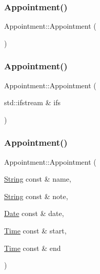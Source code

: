 \subsubsection{\texorpdfstring{Appointment()}{Appointment()}\hspace{0.1cm}{\footnotesize\ttfamily [1/3]}}
{\footnotesize\ttfamily Appointment\+::\+Appointment (\begin{DoxyParamCaption}{ }\end{DoxyParamCaption})\hspace{0.3cm}{\ttfamily [inline]}}

\mbox{\label{classAppointment_a3b5b82331c630dcce3b1e724d0e6c48e}} 
\subsubsection{\texorpdfstring{Appointment()}{Appointment()}\hspace{0.1cm}{\footnotesize\ttfamily [2/3]}}
{\footnotesize\ttfamily Appointment\+::\+Appointment (\begin{DoxyParamCaption}\item[{std\+::ifstream \&}]{ifs }\end{DoxyParamCaption})}

\mbox{\label{classAppointment_a5ad76b006f94741008318f0a5053b7a0}} 
\subsubsection{\texorpdfstring{Appointment()}{Appointment()}\hspace{0.1cm}{\footnotesize\ttfamily [3/3]}}
{\footnotesize\ttfamily Appointment\+::\+Appointment (\begin{DoxyParamCaption}\item[{\hyperlink{classString}{String} const \&}]{name,  }\item[{\hyperlink{classString}{String} const \&}]{note,  }\item[{\hyperlink{classDate}{Date} const \&}]{date,  }\item[{\hyperlink{classTime}{Time} const \&}]{start,  }\item[{\hyperlink{classTime}{Time} const \&}]{end }\end{DoxyParamCaption})}



